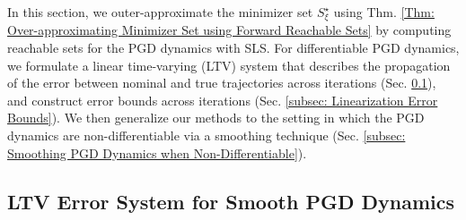 \documentclass[letterpaper, 10 pt, conference]{ieeeconf}
\newcommand{\?}{\stackrel{?}{=}}
\newcommand{\var}{\xi}
\newcommand{\varOptSet}{S_\var^\star}
\newcommand{\ratePGDStacked}{\boldsymbol{\ratePGD}}
\newcommand{\ratePGDNominalStacked}{\hat{\boldsymbol{\ratePGD}}}
\newcommand{\ratePGD}{\alpha}
\newcommand{\state}{\zeta}
\newcommand{\stateStacked}{\boldsymbol{\state}}
\newcommand{\stateNominalStacked}{\hat{\boldsymbol{\state}}}
\newcommand{\frank}[1]{{\textcolor[rgb]{0,0,1}{\textsf{[Frank: {#1}]}}}}
\newcommand{\antoine}[1]{{\textcolor[rgb]{1,0,0}{\textsf{[Antoine: {#1}]}}}}
\begin{document}
In this section, we outer-approximate the minimizer set $\varOptSet$ using Thm. \ref{Thm: Over-approximating Minimizer Set using Forward Reachable Sets} by computing reachable sets for the PGD dynamics with SLS.
For differentiable PGD dynamics, we formulate a linear time-varying (LTV) system that describes the propagation of the error between nominal and true trajectories
across iterations (Sec. \ref{subsec: LTV Error System for Smooth PGD Dynamics}), and construct error bounds across iterations (Sec. \ref{subsec: Linearization Error Bounds}).
We then generalize our methods
to the setting in which the PGD dynamics are non-differentiable
via a smoothing technique
(Sec. \ref{subsec: Smoothing PGD Dynamics when Non-Differentiable}).




\subsection{LTV Error System for Smooth PGD Dynamics}
\label{subsec: LTV Error System for Smooth PGD Dynamics}
\end{document}
